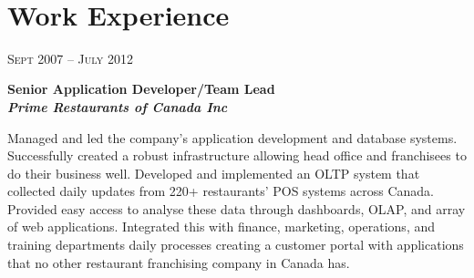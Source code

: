 \documentclass[9pt]{article} %
\begin{document}
\color{text1} %


\par{\\ %

\begin{minipage}[t]{0.5\textwidth} %
\vspace{0pt} %
	

\section{Work Experience} 


{\raggedleft\textsc{Sept 2007 -- July 2012}\par}

{\raggedright\bf Senior Application Developer/Team Lead\\
{\it Prime Restaurants of Canada Inc}\\}

\normalsize{Managed and led the company's application development and database systems. Successfully created a robust infrastructure allowing head office and franchisees to do their business well. Developed and implemented an OLTP system that collected daily updates from 220+ restaurants' POS systems across Canada. Provided easy access to analyse these data through dashboards, OLAP, and array of web applications. Integrated this with finance, marketing, operations, and training departments daily processes creating a customer portal with applications that no other restaurant franchising company in Canada has.}\\



\end{minipage}}
\end{document}

